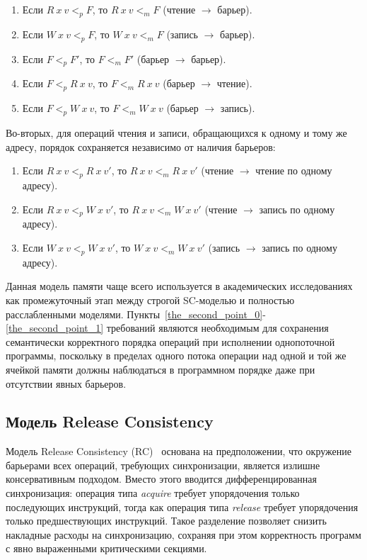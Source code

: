 \begin{enumerate}
  \item Если $R\ x\ v <_{p} F$, то $R\ x\ v <_{m} F$ (чтение
    $\rightarrow$ барьер).
  \item Если $W\ x\ v <_{p} F$, то $W\ x\ v <_{m} F$ (запись
    $\rightarrow$ барьер).
  \item Если $F <_{p} F'$, то $F <_{m} F'$ (барьер $\rightarrow$ барьер).
  \item Если $F <_{p} R\ x\ v$, то $F <_{m} R\ x\ v$ (барьер
    $\rightarrow$ чтение).
  \item Если $F <_{p} W\ x\ v$, то $F <_{m} W\ x\ v$ (барьер
    $\rightarrow$ запись).
\end{enumerate}

Во-вторых, для операций чтения и записи, обращающихся к одному и тому
же адресу, порядок сохраняется независимо от наличия барьеров:

\begin{enumerate}[resume]
  \item Если $R\ x\ v <_{p} R\ x\ v'$, то $R\ x\ v <_{m} R\ x\ v'$
    (чтение $\rightarrow$ чтение по одному адресу).\label{the_second_point_0}
  \item Если $R\ x\ v <_{p} W\ x\ v'$, то $R\ x\ v <_{m} W\ x\ v'$
    (чтение $\rightarrow$ запись по одному адресу).
  \item Если $W\ x\ v <_{p} W\ x\ v'$, то $W\ x\ v <_{m} W\ x\ v'$
    (запись $\rightarrow$ запись по одному адресу).\label{the_second_point_1}
\end{enumerate}

Данная модель памяти чаще всего используется в академических
исследованиях как промежуточный этап между строгой SC-моделью и
полностью расслабленными моделями.
Пункты~\ref{the_second_point_0}-\ref{the_second_point_1}
требований являются необходимым для сохранения семантически
корректного порядка операций при исполнении однопоточной программы,
поскольку в пределах одного потока операции над одной и той же
ячейкой памяти должны наблюдаться в программном порядке даже при
отсутствии явных барьеров.

\subsection{Модель Release Consistency}
\label{sec:rc}

Модель Release Consistency (RC)~\cite{rc} основана на предположении,
что окружение барьерами всех операций, требующих синхронизации,
является излишне консервативным подходом. Вместо этого вводится
дифференцированная синхронизация: операция типа \textit{acquire}
требует упорядочения только последующих инструкций, тогда как
операция типа \textit{release} требует упорядочения только
предшествующих инструкций. Такое разделение позволяет снизить
накладные расходы на синхронизацию, сохраняя при этом корректность
программ с явно выраженными критическими секциями.

